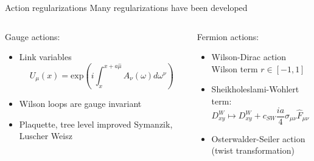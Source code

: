 \documentclass{beamer}
\begin{document}
\begin{frame}{Action regularizations}
      Many regularizations have been developed
      \vspace{\baselineskip}
      \begin{columns}
            \begin{column}{0.45\textwidth}
                  Gauge actions:
                  \begin{itemize}
                        \item Link variables $$U_\mu (x) = \text{exp}\left(i\int_x^{x+a\hat\mu} A_\nu(\omega)d\omega^\nu \right)$$
                        \item Wilson loops are gauge invariant 
                        \item Plaquette, tree level improved Symanzik, Luscher Weisz
                  \end{itemize}
            \end{column}
            \begin{column}{0.45\textwidth}
                  Fermion actions:
                  \begin{itemize}
                        \item Wilson-Dirac action\\Wilson term $r \in [-1,1]$
                        \item Sheikholeslami-Wohlert term: $$ D^W_{xy} \longmapsto D^W_{xy} + c_{SW} \frac{ia}{4}\sigma_{\mu\nu}\hat F_{\mu\nu} (x) \delta_{xy} $$
                        \item Osterwalder-Seiler action\\(twist transformation)
                  \end{itemize}
            \end{column}
      \end{columns}
\end{frame}
\end{document}
